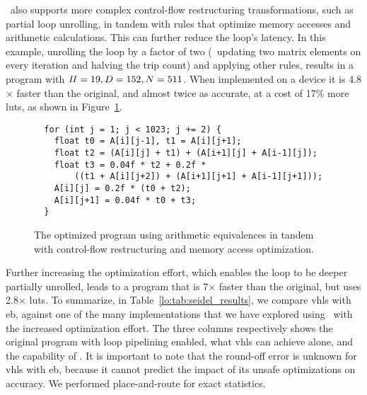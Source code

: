 \soap~also supports more complex control-flow restructuring transformations,
such as partial loop unrolling, in tandem with rules that optimize memory
accesses and arithmetic calculations.  This can further reduce the loop's
latency.  In this example, unrolling the loop by a factor of two (\ie~updating
two matrix elements on every iteration and halving the trip count) and applying
other rules, results in a program with $\mathit{II} = 19, D = 152, N = 511$.  When
implemented on a device it is 4.8$\times$ faster than the original, and
almost twice as accurate, at a cost of 17\% more \glspl{lut}, as shown in
Figure~\ref{lo:fig:seidel_prog_3}.

\begin{figure}[ht]
\begin{lstlisting}
  for (int j = 1; j < 1023; j += 2) {
    float t0 = A[i][j-1], t1 = A[i][j+1];
    float t2 = (A[i][j] + t1) + (A[i+1][j] + A[i-1][j]);
    float t3 = 0.04f * t2 + 0.2f *
        ((t1 + A[i][j+2]) + (A[i+1][j+1] + A[i-1][j+1]));
    A[i][j] = 0.2f * (t0 + t2);
    A[i][j+1] = 0.04f * t0 + t3;
  }
\end{lstlisting}
    \caption{The optimized program using arithmetic equivalences in tandem with
    control-flow restructuring and memory access optimization.}
    \label{lo:fig:seidel_prog_3}
\end{figure}

Further increasing the optimization effort, which enables the loop to be
deeper partially unrolled, leads to a program that is 7$\times$ faster
than the original, but uses 2.8$\times$ \glspl{lut}.  To summarize, in
Table~\ref{lo:tab:seidel_results}, we compare \gls{vhls} with \gls{eb}, against
one of the many implementations that we have explored using \soap~with the
increased optimization effort.  The three columns respectively shows the
original program with loop pipelining enabled, what \gls{vhls} can achieve
alone, and the capability of \soap.  It is important to note that the round-off
error is unknown for \gls{vhls} with \gls{eb}, because it cannot predict the
impact of its unsafe optimizations on accuracy.  We performed place-and-route
for exact statistics.

